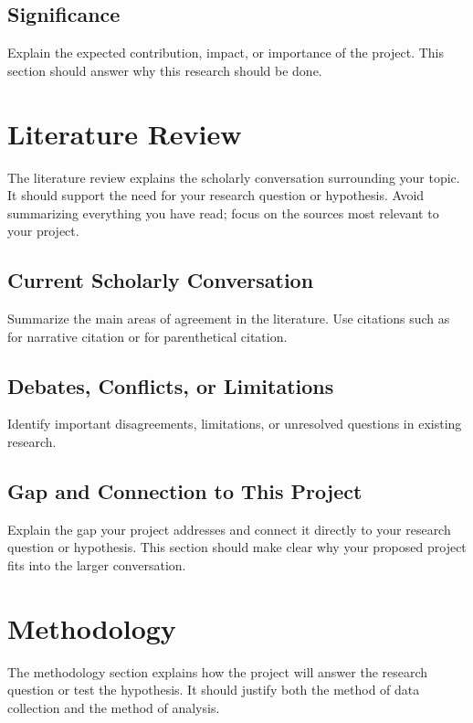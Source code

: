 \documentclass[12pt]{article}
\begin{document}
\subsection{Significance}

Explain the expected contribution, impact, or importance of the project. This
section should answer why this research should be done.

\section{Literature Review}

The literature review explains the scholarly conversation surrounding your
topic. It should support the need for your research question or hypothesis.
Avoid summarizing everything you have read; focus on the sources most relevant
to your project.

\subsection{Current Scholarly Conversation}

Summarize the main areas of agreement in the literature. Use citations such as
\textcite{sampleArticle} for narrative citation or \parencite{sampleBook} for
parenthetical citation.

\subsection{Debates, Conflicts, or Limitations}

Identify important disagreements, limitations, or unresolved questions in
existing research.

\subsection{Gap and Connection to This Project}

Explain the gap your project addresses and connect it directly to your research
question or hypothesis. This section should make clear why your proposed project
fits into the larger conversation.

\section{Methodology}

The methodology section explains how the project will answer the research
question or test the hypothesis. It should justify both the method of data
collection and the method of analysis.
\end{document}
